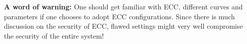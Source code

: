 \textbf{A word of warning:} One should get familiar with ECC, different curves
and parameters if one chooses to adopt ECC configurations. Since there is much
discussion on the security of ECC, flawed settings might very well compromise
the security of the entire system!


